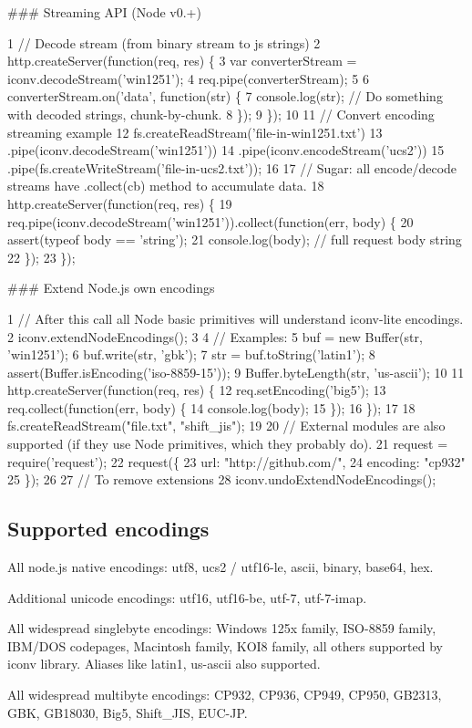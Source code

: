 \#\#\# Streaming A\+P\+I (Node v0.+) 
\begin{DoxyCode}
1 // Decode stream (from binary stream to js strings)
2 http.createServer(function(req, res) \{
3     var converterStream = iconv.decodeStream('win1251');
4     req.pipe(converterStream);
5 
6     converterStream.on('data', function(str) \{
7         console.log(str); // Do something with decoded strings, chunk-by-chunk.
8     \});
9 \});
10 
11 // Convert encoding streaming example
12 fs.createReadStream('file-in-win1251.txt')
13     .pipe(iconv.decodeStream('win1251'))
14     .pipe(iconv.encodeStream('ucs2'))
15     .pipe(fs.createWriteStream('file-in-ucs2.txt'));
16 
17 // Sugar: all encode/decode streams have .collect(cb) method to accumulate data.
18 http.createServer(function(req, res) \{
19     req.pipe(iconv.decodeStream('win1251')).collect(function(err, body) \{
20         assert(typeof body == 'string');
21         console.log(body); // full request body string
22     \});
23 \});
\end{DoxyCode}


\#\#\# Extend Node.\+js own encodings 
\begin{DoxyCode}
1 // After this call all Node basic primitives will understand iconv-lite encodings.
2 iconv.extendNodeEncodings();
3 
4 // Examples:
5 buf = new Buffer(str, 'win1251');
6 buf.write(str, 'gbk');
7 str = buf.toString('latin1');
8 assert(Buffer.isEncoding('iso-8859-15'));
9 Buffer.byteLength(str, 'us-ascii');
10 
11 http.createServer(function(req, res) \{
12     req.setEncoding('big5');
13     req.collect(function(err, body) \{
14         console.log(body);
15     \});
16 \});
17 
18 fs.createReadStream("file.txt", "shift\_jis");
19 
20 // External modules are also supported (if they use Node primitives, which they probably do).
21 request = require('request');
22 request(\{
23     url: "http://github.com/", 
24     encoding: "cp932"
25 \});
26 
27 // To remove extensions
28 iconv.undoExtendNodeEncodings();
\end{DoxyCode}


\subsection*{Supported encodings}


\begin{DoxyItemize}
\item All node.\+js native encodings\+: utf8, ucs2 / utf16-\/le, ascii, binary, base64, hex.
\item Additional unicode encodings\+: utf16, utf16-\/be, utf-\/7, utf-\/7-\/imap.
\item All widespread singlebyte encodings\+: Windows 125x family, I\+S\+O-\/8859 family, I\+B\+M/\+D\+O\+S codepages, Macintosh family, K\+O\+I8 family, all others supported by iconv library. Aliases like \textquotesingle{}latin1\textquotesingle{}, \textquotesingle{}us-\/ascii\textquotesingle{} also supported.
\item All widespread multibyte encodings\+: C\+P932, C\+P936, C\+P949, C\+P950, G\+B2313, G\+B\+K, G\+B18030, Big5, Shift\+\_\+\+J\+I\+S, E\+U\+C-\/\+J\+P.
\end{DoxyItemize}

